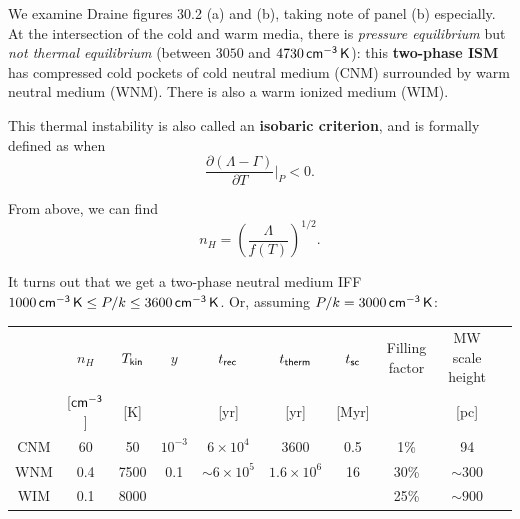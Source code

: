 \documentclass{tufte-handout}
\renewcommand{\textbf}[1]{{\bf \textcolor{dark-gray}{#1}}}
\renewcommand{\rm}{\sf}
\newcommand{\e}[1]{\times 10^{#1}}
\begin{document}
We examine Draine figures 30.2 (a) and (b), taking note of panel (b) especially. At the intersection of the cold and warm media, there is \textit{pressure equilibrium} but \textit{not thermal equilibrium} (between $3050$ and $4730 {\rm\, cm^{-3}\, K}$): this \textbf{two-phase ISM} has compressed cold pockets of cold neutral medium (CNM) surrounded by warm neutral medium (WNM). There is also a warm ionized medium (WIM).

This thermal instability is also called an \textbf{isobaric criterion}, and is formally defined as when
\begin{equation}
\frac{\partial (\Lambda - \Gamma)}{\partial T} \bigg\vert_P < 0.
\end{equation}

From above, we can find \[n_H = \left (\frac{\Lambda}{f(T)}\right )^{1/2}.\]

It turns out that we get a two-phase neutral medium IFF $1000 {\rm\, cm^{-3}\, K} \leq P/k \leq 3600 {\rm\, cm^{-3}\, K}$. Or, assuming $P/k = 3000 {\rm\, cm^{-3}\, K}$:


\begin{tabular}{c|ccccccccc}
& $n_H$  & $T_{\rm kin}$ & $y$ & $t_{\rm rec}$   & $t_{\rm therm}$ & $t_{\rm sc}$ & Filling factor & MW scale height\\
& [${\rm cm^{-3}}$] & [K] &  & [yr] & [yr] & [Myr] & & [pc]\\
\hline
CNM & 60 & 50 & $10^{-3}$ & $6\e{4}$ & 3600 & 0.5 & 1\% & 94 &\\
WNM & 0.4 & 7500 & 0.1 & $ \sim6\e{5}$ & $1.6\e{6}$ & 16& 30\% & $\sim 300$ \\
WIM & 0.1 & 8000 &&&&& 25\% & $\sim 900$
\end{tabular}
\end{document}
